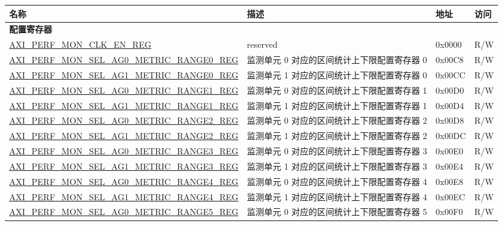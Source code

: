 \begin{longtable}{ | p{9.1cm} | p{5cm} | p{1.3cm} | p{1.3cm} | }
\hline\rowcolor{lightgray}
名称 & 描述 & 地址 & 访问 \\ \hline
\endhead
\multicolumn{4}{|l|}{\textbf{配置寄存器}} \\ \hline
\hyperref[regdesc:AXIPERFMONCLKENREG]{AXI\_PERF\_MON\_CLK\_EN\_REG} & reserved & 0x0000 & R/W\\ \hline
\hyperref[regdesc:AXIPERFMONSELAGNMETRICRANGEMREG]{AXI\_PERF\_MON\_SEL\_AG0\_METRIC\_RANGE0\_REG} & 监测单元 0 对应的区间统计上下限配置寄存器 0 & 0x00C8 & R/W\\ \hline
\hyperref[regdesc:AXIPERFMONSELAGNMETRICRANGEMREG]{AXI\_PERF\_MON\_SEL\_AG1\_METRIC\_RANGE0\_REG} & 监测单元 1 对应的区间统计上下限配置寄存器 0 & 0x00CC & R/W\\ \hline
\hyperref[regdesc:AXIPERFMONSELAGNMETRICRANGEMREG]{AXI\_PERF\_MON\_SEL\_AG0\_METRIC\_RANGE1\_REG} & 监测单元 0 对应的区间统计上下限配置寄存器 1 & 0x00D0 & R/W\\ \hline
\hyperref[regdesc:AXIPERFMONSELAGNMETRICRANGEMREG]{AXI\_PERF\_MON\_SEL\_AG1\_METRIC\_RANGE1\_REG} & 监测单元 1 对应的区间统计上下限配置寄存器 1 & 0x00D4 & R/W\\ \hline
\hyperref[regdesc:AXIPERFMONSELAGNMETRICRANGEMREG]{AXI\_PERF\_MON\_SEL\_AG0\_METRIC\_RANGE2\_REG} & 监测单元 0 对应的区间统计上下限配置寄存器 2 & 0x00D8 & R/W\\ \hline
\hyperref[regdesc:AXIPERFMONSELAGNMETRICRANGEMREG]{AXI\_PERF\_MON\_SEL\_AG1\_METRIC\_RANGE2\_REG} & 监测单元 1 对应的区间统计上下限配置寄存器 2 & 0x00DC & R/W\\ \hline
\hyperref[regdesc:AXIPERFMONSELAGNMETRICRANGEMREG]{AXI\_PERF\_MON\_SEL\_AG0\_METRIC\_RANGE3\_REG} & 监测单元 0 对应的区间统计上下限配置寄存器 3 & 0x00E0 & R/W\\ \hline
\hyperref[regdesc:AXIPERFMONSELAGNMETRICRANGEMREG]{AXI\_PERF\_MON\_SEL\_AG1\_METRIC\_RANGE3\_REG} & 监测单元 1 对应的区间统计上下限配置寄存器 3 & 0x00E4 & R/W\\ \hline
\hyperref[regdesc:AXIPERFMONSELAGNMETRICRANGEMREG]{AXI\_PERF\_MON\_SEL\_AG0\_METRIC\_RANGE4\_REG} & 监测单元 0 对应的区间统计上下限配置寄存器 4 & 0x00E8 & R/W\\ \hline
\hyperref[regdesc:AXIPERFMONSELAGNMETRICRANGEMREG]{AXI\_PERF\_MON\_SEL\_AG1\_METRIC\_RANGE4\_REG} & 监测单元 1 对应的区间统计上下限配置寄存器 4 & 0x00EC & R/W\\ \hline
\hyperref[regdesc:AXIPERFMONSELAGNMETRICRANGEMREG]{AXI\_PERF\_MON\_SEL\_AG0\_METRIC\_RANGE5\_REG} & 监测单元 0 对应的区间统计上下限配置寄存器 5 & 0x00F0 & R/W\\ \hline

\end{longtable}
